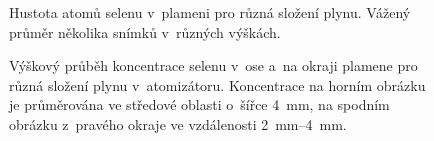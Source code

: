 \begin{figure}[htp]
	\centering
	
	\caption{Hustota atomů selenu v~plameni pro různá složení plynu.
		Vážený průměr několika snímků v~různých výškách.}
	\label{fig:lif-concentration-vertical-compositions}
\end{figure}

\begin{figure}[htp]
	\centering
	
	\bigskip\par
	
	\caption{Výškový průběh koncentrace selenu v~ose a~na okraji plamene
		pro různá složení plynu v~atomizátoru.
		Koncentrace na horním obrázku je průměrována ve středové oblasti
		o~šířce \SI{4}{\milli\metre},
		na spodním obrázku z~pravého okraje ve vzdálenosti
		\SIrange{2}{4}{\milli\metre}.}
	\label{fig:lif-concentration-vertical-slices}
\end{figure}
